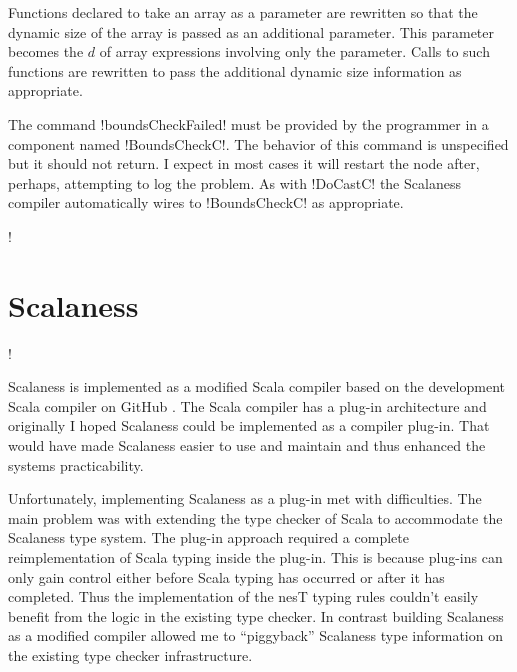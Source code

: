 
Functions declared to take an array as a parameter are rewritten so that the dynamic size of the
array is passed as an additional parameter. This parameter becomes the $d$ of array expressions
involving only the parameter. Calls to such functions are rewritten to pass the additional
dynamic size information as appropriate.

The command !boundsCheckFailed! must be provided by the programmer in a component named
!BoundsCheckC!. The behavior of this command is unspecified but it should not return. I expect
in most cases it will restart the node after, perhaps, attempting to log the problem. As with
!DoCastC! the Scalaness compiler automatically wires to !BoundsCheckC! as appropriate.

\lstDeleteShortInline!

\section{Scalaness}
\label{section-scalaness-implementation}

\lstset{language=scalaness}
\lstMakeShortInline!

Scalaness is implemented as a modified Scala compiler based on the development Scala compiler on
GitHub \cite{scalaness-home}. The Scala compiler has a plug-in architecture and originally I
hoped Scalaness could be implemented as a compiler plug-in. That would have made Scalaness
easier to use and maintain and thus enhanced the systems practicability.

Unfortunately, implementing Scalaness as a plug-in met with difficulties. The main problem was
with extending the type checker of Scala to accommodate the Scalaness type system. The plug-in
approach required a complete reimplementation of Scala typing inside the plug-in. This is
because plug-ins can only gain control either before Scala typing has occurred or after it has
completed. Thus the implementation of the nesT typing rules couldn't easily benefit from the
logic in the existing type checker. In contrast building Scalaness as a modified compiler
allowed me to ``piggyback'' Scalaness type information on the existing type checker
infrastructure.


